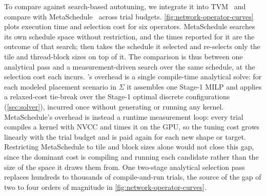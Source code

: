 To compare \name against search-based autotuning, we integrate it into TVM~\cite{tvm} and compare with MetaSchedule~\cite{metaschedule} across trial budgets. \autoref{fig:network-operator-curves} plots execution time and selection cost for six operators. MetaSchedule searches its own schedule space without restriction, and the times reported for it are the outcome of that search; \name then takes the schedule it selected and re-selects only the tile and thread-block sizes on top of it. The comparison is thus between one analytical pass and a measurement-driven search over the same schedule, at the selection cost each incurs. \name's overhead is a single compile-time analytical solve: for each modeled placement scenario in \(\Sigma\) it assembles one Stage-1 MILP and applies a relaxed-cost tie-break over the Stage-1 optimal discrete configurations (\autoref{sec:solver}), incurred once without generating or running any kernel. MetaSchedule's overhead is instead a runtime measurement loop: every trial compiles a kernel with NVCC and times it on the GPU, so the tuning cost grows linearly with the trial budget and is paid again for each new shape or target. Restricting MetaSchedule to tile and block sizes alone would not close this gap, since the dominant cost is compiling and running each candidate rather than the size of the space it draws them from. One two-stage analytical selection pass replaces hundreds to thousands of compile-and-run trials, the source of the gap of two to four orders of magnitude in \autoref{fig:network-operator-curves}.

